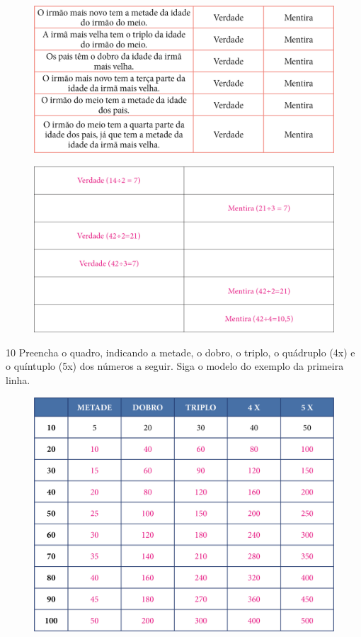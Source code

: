 \begin{figure}[htpb!]
\includegraphics[width=\textwidth]{./media/image109.png}
\end{figure}

\begin{figure}[htpb!]
\includegraphics[width=\textwidth]{./media/image110.png}
\end{figure}

\pagebreak
\num{10} Preencha o quadro, indicando a metade, o dobro, o triplo, o quádruplo
(4x) e o quíntuplo (5x) dos números a seguir. Siga o modelo do exemplo da
primeira linha.

\begin{figure}[htpb!]
\includegraphics[width=\textwidth]{./media/image111.png}
\end{figure}

